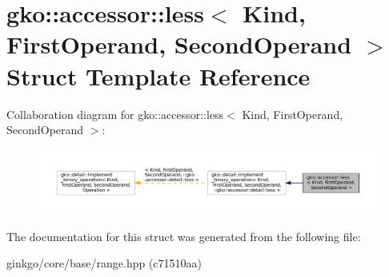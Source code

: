 \hypertarget{structgko_1_1accessor_1_1less}{}\section{gko\+:\+:accessor\+:\+:less$<$ Kind, First\+Operand, Second\+Operand $>$ Struct Template Reference}
\label{structgko_1_1accessor_1_1less}


Collaboration diagram for gko\+:\+:accessor\+:\+:less$<$ Kind, First\+Operand, Second\+Operand $>$\+:
\nopagebreak
\begin{figure}[H]
\begin{center}
\leavevmode
\includegraphics[width=350pt]{structgko_1_1accessor_1_1less__coll__graph}
\end{center}
\end{figure}


The documentation for this struct was generated from the following file\+:\begin{DoxyCompactItemize}
\item 
ginkgo/core/base/range.\+hpp (c71510aa)\end{DoxyCompactItemize}
